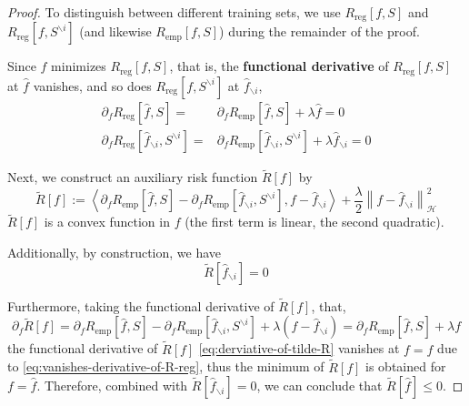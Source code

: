 \begin{proof}
	To distinguish between different training sets, we use $R_{\text{reg}}[f, S]$ and $R_{\text{reg}}[f, S^{\backslash i}]$ (and likewise $R_{\text{emp}}[f, S]$) during the remainder of the proof.

	Since $\hat{f}$ minimizes $R_{\text{reg}}[f,S]$, that is, the \textbf{functional derivative} \cite{stephane_canu_lecture_2014} of $R_{\text{reg}}[f,S]$ at $\hat{f}$ vanishes, and so does $R_{\text{reg}}[f,S^{\backslash i}]$ at $\hat{f}_{\backslash i}$,
	\begin{equation}
		\label{eq:vanishes-derivative-of-R-reg}
		\begin{aligned}
			\partial_{f}R_{\text{reg}}\left[\hat{f},S\right]=                               & \partial_{f}R_{\text{emp}}\left[\hat{f},S\right]+\lambda\hat{f}=0                                              \\
			\partial_{f}R_{\text{reg}}\left[\hat{f}_{\backslash i},S^{\backslash i}\right]= & \partial_{f}R_{\text{emp}}\left[\hat{f}_{\backslash i},S^{\backslash i}\right]+\lambda\hat{f}_{\backslash i}=0
		\end{aligned}
	\end{equation}

	Next, we construct an auxiliary risk function $\tilde{R}[f]$ by
	\begin{equation}
		\tilde{R}[f]:=\left\langle\partial_{f}R_{\text{emp}}\left[\hat{f},S\right]-\partial_{f}R_{\text{emp}}\left[\hat{f}_{\backslash i},S^{\backslash i}\right],f-\hat{f}_{\backslash i}\right\rangle+\frac{\lambda}{2}\left\|f-\hat{f}_{\backslash i}\right\|_{\mathcal{H}}^{2}
	\end{equation}
	$\tilde{R}[f]$ is a convex function in $f$ (the first term is linear, the second quadratic).

	Additionally, by construction, we have
	\begin{equation}
		\tilde{R}[\hat{f}_{\backslash i}]=0
	\end{equation}

	Furthermore, taking the functional derivative of $\tilde{R}[f]$, that,
	\begin{equation}
		\label{eq:derviative-of-tilde-R}
		\partial_{f}\tilde{R}[f]=\partial_{f}R_{\text{emp}}\left[\hat{f},S\right]-\partial_{f}R_{\text{emp}}\left[\hat{f}_{\backslash i},S^{\backslash i}\right]+\lambda\left(f-\hat{f}_{\backslash i}\right)=\partial_{f}R_{\text{emp}}\left[\hat{f},S\right]+\lambda f
	\end{equation}
	the functional derivative of $\tilde{R}[f]$ \eqref{eq:derviative-of-tilde-R} vanishes at $f=\hat{f}$ due to \eqref{eq:vanishes-derivative-of-R-reg}, thus the minimum of $\tilde{R}[f]$ is obtained for $f=\hat{f}$. Therefore, combined with $\tilde{R}[\hat{f}_{\backslash i}]=0$, we can conclude that $\tilde{R}[\hat{f}]\leq 0$.


\end{proof}
